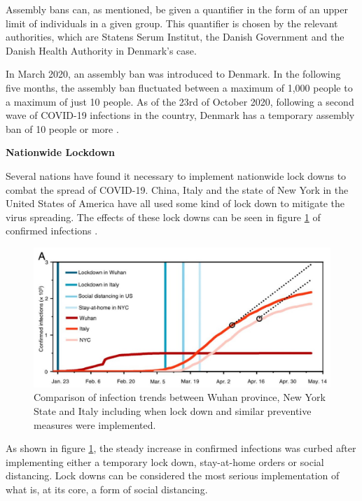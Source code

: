 Assembly bans can, as mentioned, be given a quantifier in the form of an upper limit of individuals in a given group. This quantifier is chosen by the relevant authorities, which are Statens Serum Institut\citep{ssi_statens_nodate}, the Danish Government and the Danish Health Authority in Denmark's case. 

In March 2020, an assembly ban was introduced to Denmark. In the following five months, the assembly ban fluctuated between a maximum of 1,000 people to a maximum of just 10 people. As of the 23rd of October 2020, following a second wave of COVID-19 infections in the country, Denmark has a temporary assembly ban of 10 people or more \citep{ronnstad_tidslinje_2020}.

\textbf{Nationwide Lockdown}

Several nations have found it necessary to implement nationwide lock downs to combat the spread of COVID-19. China, Italy and the state of New York in the United States of America have all used some kind of lock down to mitigate the virus spreading. The effects of these lock downs can be seen in figure \ref{fig:Confirmed-infections-international} of confirmed infections \citep{zhang_identifying_2020}.

\begin{figure}[H]
    \centering
    \includegraphics[width=\textwidth]{0_billeder/confirmed-infections-international.jpg}   
    \caption{Comparison of infection trends between Wuhan province, New York State and Italy including when lock down and similar preventive measures were implemented.
    \citep{zhang_identifying_2020}}
    \label{fig:Confirmed-infections-international}
\end{figure}

As shown in figure \ref{fig:Confirmed-infections-international}, the steady increase in confirmed infections was curbed after implementing either a temporary lock down, stay-at-home orders or social distancing. Lock downs can be considered the most serious implementation of what is, at its core, a form of social distancing. 

